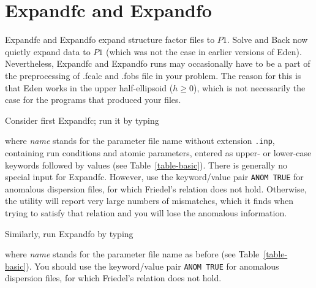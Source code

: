 \documentclass{report}
\begin{document}
{

\section {Expandfc and Expandfo}
\label{preprocessors-expand}

Expandfc and Expandfo expand structure factor files 
to $P1$.  Solve and Back now quietly expand data to 
$P1$ (which was not the case in earlier versions of Eden).
Nevertheless,
Expandfc and Expandfo runs may occasionally have to be a part of the 
preprocessing of .fcalc and .fobs file in your problem.
The reason for this is that Eden works in the upper 
half-ellipsoid ($h \geq 0$), which is not necessarily the case for the
programs that produced your files.

Consider first Expandfc; run it by typing


where {\it name} stands for the parameter file name without extension 
{\tt .inp}, containing run conditions and atomic parameters, 
entered as upper- or lower-case keywords followed by values
(see Table~\ref{table-basic}).  There is generally no special input for 
Expandfc.  However, 
use the keyword/value pair {\tt ANOM TRUE} for 
anomalous dispersion files, 
for which Friedel's relation does not hold.  Otherwise, the utility will
report very large numbers of mismatches, which it finds when trying to
satisfy that relation and you will lose the anomalous information.

\vspace {0.1in}

Similarly, run Expandfo by typing


where {\it name} stands for the parameter file name as before
(see Table~\ref{table-basic}).  
You should use the keyword/value pair {\tt ANOM TRUE} 
for anomalous dispersion files, 
for which Friedel's relation does not hold.

\vspace {0.1in}

}
\end{document}
